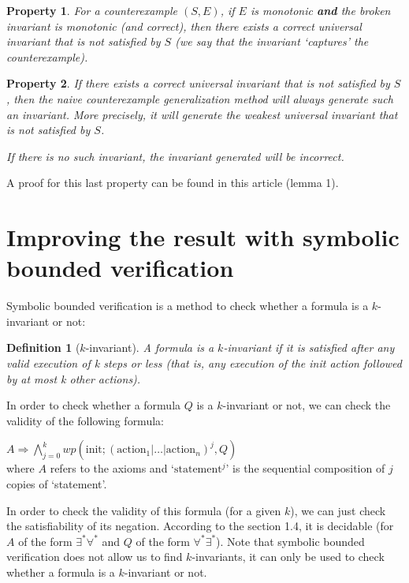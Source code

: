 \documentclass[11pt,a4paper,oldfontcommands,openany]{memoir}
\newtheorem*{definition}{Definition}
\newtheorem*{property}{Property}
\begin{document}
    \begin{property}
        For a counterexample \((S,E)\), if \(E\) is monotonic \textbf{and} the broken invariant is monotonic (and correct),
        then there exists a correct universal invariant that is not satisfied by \(S\) (we say that the invariant `captures' the counterexample).
    \end{property}
    \begin{property}
        If there exists a correct universal invariant that is not satisfied by \(S\), then
        the naive counterexample generalization method will always generate such an invariant.
        More precisely, it will generate the weakest universal invariant that is not satisfied by \(S\).

        If there is no such invariant, the invariant generated will be incorrect.
    \end{property}
    
    A proof for this last property can be found in this\cite{Karbyshev:2017:PIU:3065931.3022187} article (lemma 1).

    \section{Improving the result with symbolic bounded verification}

    Symbolic bounded verification is a method to check whether a formula is a \(k\)-invariant or not:

    \begin{definition}[\(k\)-invariant]
        A formula is a \(k\)-invariant if it is satisfied after any valid execution of k steps or less
        (that is, any execution of the init action followed by at most k other actions).
    \end{definition}
    
    In order to check whether a formula \(Q\) is a \(k\)-invariant or not, we can check the validity of the following formula:

    \( A \Rightarrow \bigwedge\limits_{j=0}^k wp(\text{init}; (\text{action}_1|\ldots|\text{action}_n)^j, Q) \)\\
    where \(A\) refers to the axioms and `\(\text{statement}^j\)' is the sequential composition of \(j\) copies of `statement'.

    In order to check the validity of this formula (for a given \(k\)), we can just check the satisfiability of its negation.
    According to the section 1.4, it is decidable (for \(A\) of the form \(\exists^*\forall^*\) and \(Q\) of the form \(\forall^*\exists^*\)).
    Note that symbolic bounded verification does not allow us to find \(k\)-invariants, it can only be used to check whether a formula is a \(k\)-invariant or not.
\end{document}
